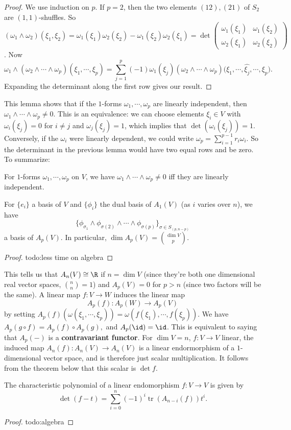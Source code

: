 \begin{proof}
    We use induction on $p$. If $p=2$, then the two elements $(12),(21)$ of $S_2$ are $(1,1)$-shuffles. So $(\omega_1\wedge\omega_2)(\xi_1,\xi_2)=\omega_1(\xi_1)\omega_2(\xi_2)-\omega_1(\xi_2)\omega_2(\xi_1)=\det \left( 
    \begin{smallmatrix}
        \omega_1(\xi_1) & \omega_1(\xi_2)\\
        \omega_2(\xi_1) & \omega_2(\xi_2)
    \end{smallmatrix}\right) $. Now \[
    \omega_1\wedge (\omega_2\wedge \cdots \wedge \omega_p)(\xi_1,\cdots ,\xi_p)=\sum_{j=1}^{p} (-1)\omega_1(\xi_j )(\omega_2\wedge \cdots \wedge \omega_p)\big(\xi_1,\cdots ,\hat{\xi_j },\cdots ,\xi_p\big).
    \] Expanding the determinant along the first row gives our result.
\end{proof}
This lemma shows that if the $1$-forms $\omega_1,\cdots ,\omega_p $ are linearly independent, then $\omega_1\wedge\cdots \wedge\omega_p\neq 0$. This is an equivalence: we can choose elements $\xi_i \in V$ with $\omega_i (\xi_j )=0$ for $i\neq j$ and $\omega_j (\xi_j )=1$, which implies that $\det (\omega_i (\xi_j ))=1$. Conversely, if the $\omega_i $ were linearly dependent, we could write $\omega_p=\sum _{i=1}^{p-1}r_i \omega_i $. So the determinant in the previous lemma would have two equal rows and be zero. To summarize:
\begin{lemma}
    For $1$-forms $\omega_1,\cdots ,\omega_p$ on $V$, we have $\omega_1\wedge \cdots \wedge \omega_p \neq 0$ iff they are linearly independent.
\end{lemma}
\begin{theorem}\label{basis} 
    For $\{e_i \} $ a basis of $V$ and $\{\phi_i \} $ the dual basis of $A_1(V)$ (as $i$ varies over $n$), we have \[
        \{\phi_{\sigma_1 }\wedge \phi_{\sigma(2)}\wedge \cdots \wedge \phi_{\sigma(p)}\} _{\sigma \in S_{(p,n-p)}}
    \] a basis of $A_p(V)$. In particular, $\dim A_p(V)={\dim V\choose p}  $. 
\end{theorem}
\begin{proof}
    {\color{red}todo:less time on algebra} 
\end{proof}
This tells us that $A_n (V)\cong \R$ if $n=\dim V$ (since they're both one dimensional real vector spaces, ${n\choose n} =1$) and $A_p(V)=0$ for $p>n$ (since two factors will be the same). A linear map $f \colon V \to W$ induces the linear map  \[
    A_p(f) \colon A_p(W) \to A_p(V)
\] by setting $A_p(f)(\omega(\xi_1,\cdots ,\xi_p))=\omega(f(\xi_1),\cdots ,f(\xi_p)).$ We have $A_p(g \circ f)=A_p(f) \circ A_p(g),$ and $A_p(\id)=\id$. This is equivalent to saying that $A_p(-)$ is a \textbf{contravariant functor}. For $\dim V=n$, $f \colon V \to V$ linear, the induced map $A_n (f) \colon A_n (V) \to A_n (V)$ is a linear endormorphism of a $1$-dimensional vector space, and is therefore just scalar multiplication. It follows from the theorem below that this scalar is $\det f$.

\begin{theorem}
    The characteristic polynomial of a linear endomorphism $f \colon V \to V$ is given by \[
        \det (f-t)=\sum_{i=0}^{n} (-1)^i \operatorname{tr}\left( A_{n-i}(f) \right) t ^i .
    \] 
\end{theorem}
\begin{proof}
    {\color{red}todo:algebra} 
\end{proof}
